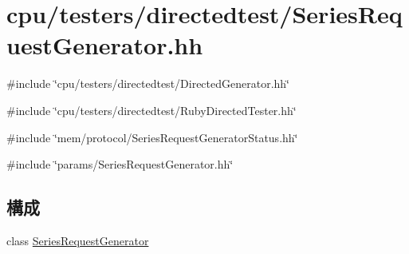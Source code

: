 \hypertarget{SeriesRequestGenerator_8hh}{
\section{cpu/testers/directedtest/SeriesRequestGenerator.hh}
\label{SeriesRequestGenerator_8hh}
}
{\ttfamily \#include \char`\"{}cpu/testers/directedtest/DirectedGenerator.hh\char`\"{}}\par
{\ttfamily \#include \char`\"{}cpu/testers/directedtest/RubyDirectedTester.hh\char`\"{}}\par
{\ttfamily \#include \char`\"{}mem/protocol/SeriesRequestGeneratorStatus.hh\char`\"{}}\par
{\ttfamily \#include \char`\"{}params/SeriesRequestGenerator.hh\char`\"{}}\par
\subsection*{構成}
\begin{DoxyCompactItemize}
\item 
class \hyperlink{classSeriesRequestGenerator}{SeriesRequestGenerator}
\end{DoxyCompactItemize}

